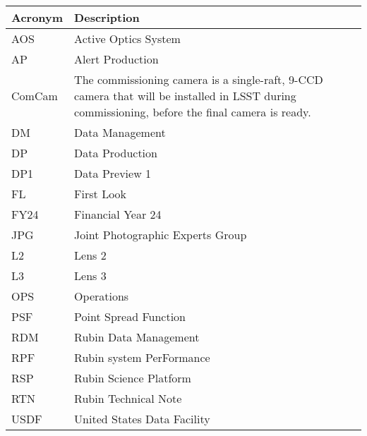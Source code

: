 \addtocounter{table}{-1}
\begin{longtable}{p{}p{}}\hline
\textbf{Acronym} & \textbf{Description}  \\\hline

AOS & Active Optics System \\\hline
AP & Alert Production \\\hline
ComCam & The commissioning camera is a single-raft, 9-CCD camera that will be installed in LSST during commissioning, before the final camera is ready. \\\hline
DM & Data Management \\\hline
DP & Data Production \\\hline
DP1 & Data Preview 1 \\\hline
FL & First Look \\\hline
FY24 & Financial Year 24 \\\hline
JPG & Joint Photographic Experts Group \\\hline
L2 & Lens 2 \\\hline
L3 & Lens 3 \\\hline
OPS & Operations \\\hline
PSF & Point Spread Function \\\hline
RDM & Rubin Data Management \\\hline
RPF & Rubin system PerFormance \\\hline
RSP & Rubin Science Platform \\\hline
RTN & Rubin Technical Note \\\hline
USDF & United States Data Facility \\\hline
\end{longtable}

